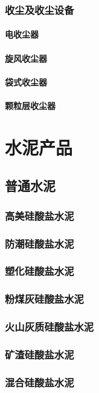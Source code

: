 \documentclass[UTF8]{../../ApplicationUniverse}
\begin{document}
        \subsubsection{收尘及收尘设备}
            \paragraph{电收尘器}
            \paragraph{旋风收尘器}
            \paragraph{袋式收尘器}
            \paragraph{颗粒层收尘器}
\section{水泥产品}
    \subsection{普通水泥}
        \subsubsection{高美硅酸盐水泥}
        \subsubsection{防潮硅酸盐水泥}
        \subsubsection{塑化硅酸盐水泥}
        \subsubsection{粉煤灰硅酸盐水泥}
        \subsubsection{火山灰质硅酸盐水泥}
        \subsubsection{矿渣硅酸盐水泥}
        \subsubsection{混合硅酸盐水泥}
\end{document}

